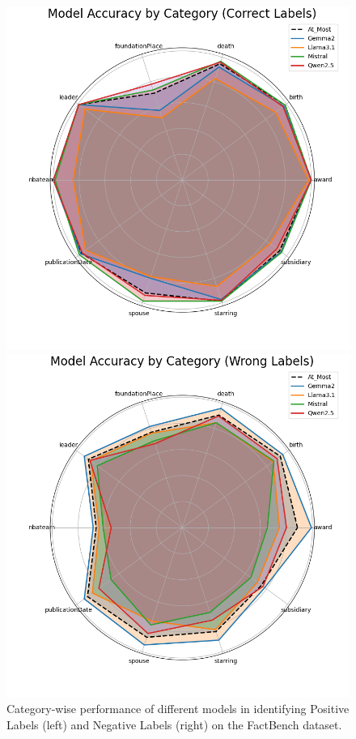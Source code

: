 \begin{figure}[ht!]
    \centering
    \begin{minipage}[b]{0.4\textwidth}
        \centering
        \includegraphics[width=\textwidth]{res/combined_correct_radar_chart}
    \end{minipage}
    \hspace{0.05\textwidth} %
    \begin{minipage}[b]{0.4\textwidth}
        \centering
        \includegraphics[width=\textwidth]{res/combined_wrong_radar_chart}
    \end{minipage}
    \caption{Category-wise performance of different models in identifying Positive Labels (left) and Negative Labels (right) on the FactBench dataset.}
    \label{fig:radar-charts}
\end{figure}

